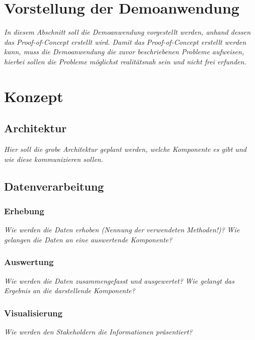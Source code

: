 	
\section{Vorstellung der Demoanwendung}

	\textit{In diesem Abschnitt soll die Demoanwendung vorgestellt werden, anhand dessen das Proof-of-Concept erstellt wird. Damit das Proof-of-Concept erstellt werden kann, muss die Demoanwendung die zuvor beschriebenen Probleme aufweisen, hierbei sollen die Probleme möglichst realitätsnah sein und nicht frei erfunden.}
	
\section{Konzept}
	
	\subsection{Architektur}

	\textit{Hier soll die grobe Architektur geplant werden, welche Komponente es gibt und wie diese kommunizieren sollen.}
	
	\subsection{Datenverarbeitung}
		
		\subsubsection{Erhebung}
		\textit{Wie werden die Daten erhoben (Nennung der verwendeten Methoden!)?}
		\textit{Wie gelangen die Daten an eine auswertende Komponente?}
		
		\subsubsection{Auswertung}
		\textit{Wie werden die Daten zusammengefasst und ausgewertet?}
		\textit{Wie gelangt das Ergebnis an die darstellende Komponente?}
		
		\subsubsection{Visualisierung}
		\textit{Wie werden den Stakeholdern die Informationen präsentiert?}

